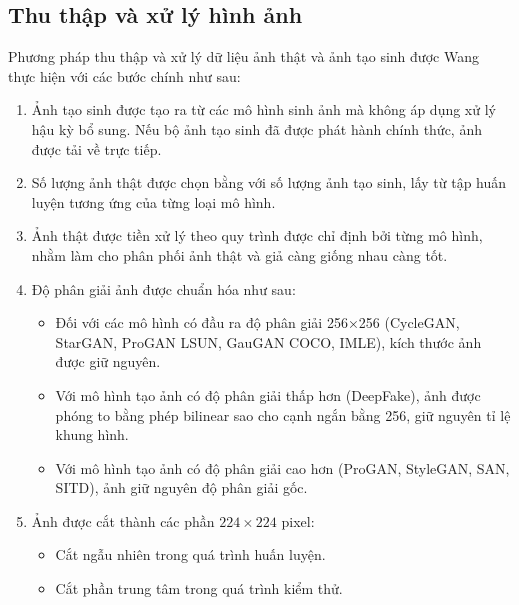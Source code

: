 \subsection{Thu thập và xử lý hình ảnh}
\label{ssec:thu_thap_va_xu_ly_hinh_anh}
%
Phương pháp thu thập và xử lý dữ liệu ảnh thật và ảnh tạo sinh được Wang~\cite{Wang2019CNNGeneratedIA} thực hiện với các bước chính như sau:
%
%
\begin{enumerate}
	\item Ảnh tạo sinh được tạo ra từ các mô hình sinh ảnh mà không áp dụng xử lý hậu kỳ bổ sung. Nếu bộ ảnh tạo sinh đã được phát hành chính thức, ảnh được tải về trực tiếp.
	
	\item Số lượng ảnh thật được chọn bằng với số lượng ảnh tạo sinh, lấy từ tập huấn luyện tương ứng của từng loại mô hình.
	
	\item Ảnh thật được tiền xử lý theo quy trình được chỉ định bởi từng mô hình, nhằm làm cho phân phối ảnh thật và giả càng giống nhau càng tốt.
	
	\item Độ phân giải ảnh được chuẩn hóa như sau:
	\begin{itemize}
		\item Đối với các mô hình có đầu ra độ phân giải 256×256 (CycleGAN, StarGAN, ProGAN LSUN, GauGAN COCO, IMLE), kích thước ảnh được giữ nguyên.
		\item Với mô hình tạo ảnh có độ phân giải thấp hơn (DeepFake), ảnh được phóng to bằng phép \gls{bilinear} sao cho cạnh ngắn bằng 256, giữ nguyên tỉ lệ khung hình.
		\item Với mô hình tạo ảnh có độ phân giải cao hơn (ProGAN, StyleGAN, SAN, SITD), ảnh giữ nguyên độ phân giải gốc.
	\end{itemize}
	
	\item Ảnh được cắt thành các phần $224 \times 224$ pixel:
	\begin{itemize}
		\item Cắt ngẫu nhiên trong quá trình huấn luyện.
		\item Cắt phần trung tâm trong quá trình kiểm thử.
	\end{itemize}
	
\end{enumerate}
%
%

